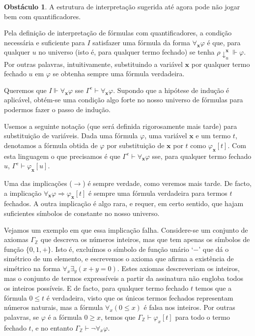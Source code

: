 \documentclass{report}
\theoremstyle{definition}
\newtheorem{obstaculo}{Obstáculo}
\theoremstyle{remark}
\newcommand{\Z}{\mathbb{Z}}
\renewcommand{\bf}[1]{\mathbf{#1}}
\newcommand{\imply}{\mathbin{\Rightarrow}}
\begin{document}
	\begin{obstaculo}
	A estrutura de interpretação sugerida até agora pode não jogar bem com quantificadores.
	
	Pela definição de interpretação de fórmulas com quantificadores, a condição necessária e suficiente para $I$ satisfazer uma fórmula da forma $\forall_{\bf x} \varphi$ é que, para qualquer $u$ no universo (isto é, para qualquer termo fechado) se tenha $\rho\!\downarrow^{\bf x}_u \Vdash \varphi$. Por outras palavras, intuitivamente, substituindo a variável $\bf x$ por qualquer termo fechado $u$ em $\varphi$ se obtenha sempre uma fórmula verdadeira.
	
	Queremos que $I \Vdash \forall_{\bf x} \varphi$ sse $\Gamma^e \vdash \forall_{\bf x} \varphi$. Supondo que a hipótese de indução é aplicável, obtém-se uma condição algo forte no nosso universo de fórmulas para podermos fazer o passo de indução.
	
	Usemos a seguinte notação (que será definida rigorosamente mais tarde) para substituição de variáveis. Dada uma fórmula $\varphi$, uma variável $\bf x$ e um termo $t$, denotamos a fórmula obtida de $\varphi$ por substituição de $\bf x$ por $t$ como $\varphi_{\bf x}[t]$. Com esta linguagem o que precisamos é que $\Gamma^e \vdash \forall_{\bf x} \varphi$ sse, para qualquer termo fechado $u$, $\Gamma^e \vdash \varphi_{\bf x}[u]$.
	
	Uma das implicações ($\rightarrow$) é sempre verdade, como veremos mais tarde. De facto, a implicação $\forall_{\bf x} \varphi \imply \varphi_{\bf x}[t]$ é sempre uma fórmula verdadeira para termos $t$ fechados. A outra implicação é algo rara, e requer, em certo sentido, que hajam suficientes símbolos de constante no nosso universo.
	
	Vejamos um exemplo em que essa implicação falha. Considere-se um conjunto de axiomas $\Gamma_\Z$ que descreva os números inteiros, mas que tem apenas os símbolos de função $\{0, 1, +\}$. Isto é, excluímos o símbolo de função unário `$-$' que dá o simétrico de um elemento, e escrevemos o axioma que afirma a existência de simétrico na forma $\forall_x \exists_y (x + y = 0)$. Estes axiomas descreveriam os inteiros, mas o conjunto de termos expressíveis a partir da assinatura não engloba todos os inteiros possíveis. E de facto, para qualquer termo fechado $t$ temos que a fórmula $0 \leq t$ é verdadeira, visto que os únicos termos fechados representam números naturais, mas a fórmula $\forall_x (0 \leq x)$ é falsa nos inteiros. Por outras palavras, se $\varphi$ é a fórmula $0 \geq x$, temos que $\Gamma_\Z \vdash \varphi_x[t]$ para todo o termo fechado $t$, e no entanto $\Gamma_\Z \vdash \neg \forall_x \varphi$.
	\end{obstaculo}
	
\end{document}
